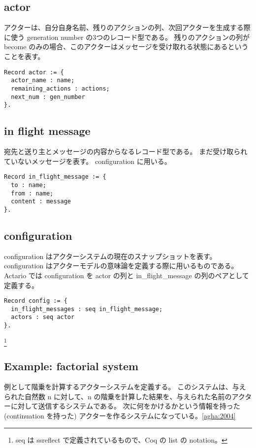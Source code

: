 \subsection{actor}
アクターは、自分自身名前、残りのアクションの列、次回アクターを生成する際に使う generation number の3つのレコード型である。
残りのアクションの列が become のみの場合、このアクターはメッセージを受け取れる状態にあるということを表す。

\begin{lstlisting}
Record actor := {
  actor_name : name;
  remaining_actions : actions;
  next_num : gen_number
}.
\end{lstlisting}

\subsection{in flight message}
宛先と送り主とメッセージの内容からなるレコード型である。
まだ受け取られていないメッセージを表す。
configuration に用いる。

\begin{lstlisting}
Record in_flight_message := {
  to : name;
  from : name;
  content : message
}.
\end{lstlisting}

\subsection{configuration}
configuration はアクターシステムの現在のスナップショットを表す。
configuration はアクターモデルの意味論を定義する際に用いるものである。
Actario では configuration を actor の列と in\_flight\_message の列のペアとして定義する。

\begin{lstlisting}
Record config := {
  in_flight_messages : seq in_flight_message;
  actors : seq actor
}.
\end{lstlisting}

\footnote{seq は ssreflect で定義されているもので、Coq の list の notation。}

\subsection{Example: factorial system}
例として階乗を計算するアクターシステムを定義する。
このシステムは、与えられた自然数 n に対して、n の階乗を計算した結果を、与えられた名前のアクターに対して送信するシステムである。
次に何をかけるかという情報を持った (continuation を持った) アクターを作るシステムになっている。\ref{agha:2004}


